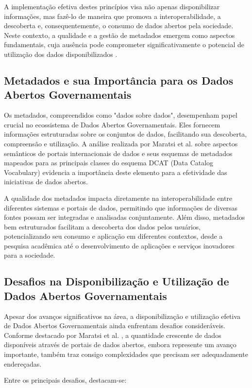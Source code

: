 A implementação efetiva destes princípios visa não apenas disponibilizar informações, mas fazê-lo de maneira que promova a interoperabilidade, a descoberta e, consequentemente, o consumo de dados abertos pela sociedade. Neste contexto, a qualidade e a gestão de metadados emergem como aspectos fundamentais, cuja ausência pode comprometer significativamente o potencial de utilização dos dados disponibilizados \cite{ref_6}.

\subsection{Metadados e sua Importância para os Dados Abertos Governamentais}

Os metadados, compreendidos como "dados sobre dados", desempenham papel crucial no ecossistema de Dados Abertos Governamentais. Eles fornecem informações estruturadas sobre os conjuntos de dados, facilitando sua descoberta, compreensão e utilização. A análise realizada por Maratsi et al. \cite{ref_6} sobre aspectos semânticos de portais internacionais de dados e seus esquemas de metadados mapeados para as principais classes do esquema DCAT (Data Catalog Vocabulary) evidencia a importância deste elemento para a efetividade das iniciativas de dados abertos.

A qualidade dos metadados impacta diretamente na interoperabilidade entre diferentes sistemas e portais de dados, permitindo que informações de diversas fontes possam ser integradas e analisadas conjuntamente. Além disso, metadados bem estruturados facilitam a descoberta dos dados pelos usuários, potencializando seu consumo e aplicação em diferentes contextos, desde a pesquisa acadêmica até o desenvolvimento de aplicações e serviços inovadores para a sociedade.

\subsection{Desafios na Disponibilização e Utilização de Dados Abertos Governamentais}

Apesar dos avanços significativos na área, a disponibilização e utilização efetiva de Dados Abertos Governamentais ainda enfrentam desafios consideráveis. Conforme destacado por Maratsi et al. \cite{ref_6}, a quantidade crescente de dados disponíveis através de portais de dados abertos, embora represente um avanço importante, também traz consigo complexidades que precisam ser adequadamente endereçadas.

Entre os principais desafios, destacam-se:

